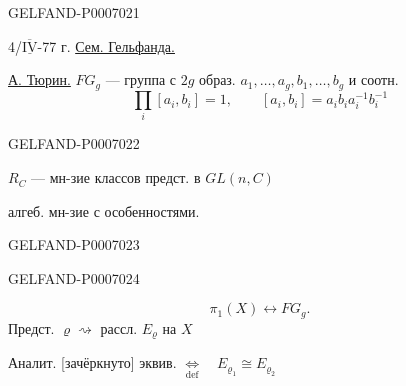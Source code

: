 \begin{GelfandAdjacentEvidence}{GELFAND-P000702}{1}

4/\(\overline{\underline{\mathrm{IV}}}\)-77 г. \underline{Сем. Гельфанда.}

\underline{А. Тюрин.}
\(FG_g\) --- группа с \(2g\) образ. \(a_1,\ldots,a_g,b_1,\ldots,b_g\) и соотн.
\[
\prod_i[a_i,b_i]=1,\qquad [a_i,b_i]=a_i b_i a_i^{-1}b_i^{-1}
\]
\end{GelfandAdjacentEvidence}
\begin{GelfandAdjacentEvidence}{GELFAND-P000702}{2}


\(R_C\) --- мн-зие классов предст. в \(GL(n,C)\)

алгеб. мн-зие с особенностями.

\end{GelfandAdjacentEvidence}
\begin{GelfandAdjacentEvidence}{GELFAND-P000702}{3}

\end{GelfandAdjacentEvidence}
\begin{GelfandAdjacentEvidence}{GELFAND-P000702}{4}


\[
\pi_1(X)\longleftrightarrow FG_g.
\]
Предст. \(\varrho\rightsquigarrow\) рассл. \(E_{\varrho}\) на \(X\)

Аналит. [зачёркнуто] эквив.
\(\underset{\mathrm{def}}{\Longleftrightarrow}\quad E_{\varrho_1}\cong E_{\varrho_2}\)
\end{GelfandAdjacentEvidence}
